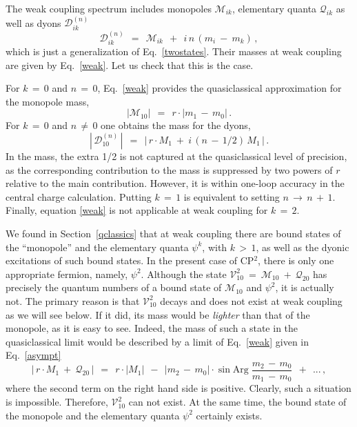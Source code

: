 \documentclass[epsfig,12pt]{article}
\def\beq{\begin{equation}}
\def\eeq{\end{equation}}
\def\beq{\begin{equation}}
\def\eeq{\end{equation}}
\newcommand{\M}{\mathcal{M}}
\newcommand{\Q}{\mathcal{Q}}
\newcommand{\D}{\mathcal{D}}
\newcommand{\V}{\mathcal{V}}
\begin{document}
	The weak coupling spectrum includes monopoles $ \M_{ik} $, elementary quanta $ \Q_{ik} $ 
	as well as dyons $ \D^{(n)}_{ik} $
\beq
	\D^{(n)}_{ik} ~~=~~ \M_{ik} ~~+~~ i\, n\, ( m_i ~-~ m_k ) \,,
\eeq
	which is just a generalization of Eq.~\eqref{twostates}.
	Their masses at weak coupling are given by Eq.~\eqref{weak}.
	Let us check that  this is the case.
	
	For $ k \,=\, 0 $ and $ n \,=\, 0 $, Eq.~\eqref{weak} provides the quasiclassical approximation for the monopole mass,
\beq
	| \M_{10} |  ~~=~~  r \cdot | m_1 \,-\, m_0 | \,.
\eeq
	For $ k \,=\, 0 $ and $ n \,\neq\, 0 $ one obtains the mass for the dyons,
\beq
	\left|\, \D_{10}^{(n)} \,\right|  ~~=~~  \left|\, r \cdot M_1  ~+~  i\, (n \,-\, 1/2)\, M_1 \,\right| \,.
\eeq
	In the mass, the extra 1/2 is not captured at the quasiclassical level of precision, as the corresponding
	contribution to the mass
	is suppressed by two powers of $ r $ relative to the main contribution. However, it is within one-loop accuracy in
	the central charge calculation.
	Putting $ k \,=\, 1 $ is equivalent to setting $ n \,\to\, n \,+\, 1 $.
	Finally, equation \eqref{weak} is not applicable at weak coupling for $ k \,=\, 2 $.

	We found in Section~\ref{qclassics} that at weak coupling there are
	bound states of the ``monopole'' and the elementary quanta $ \psi^k $, with $ k \,>\, 1 $,
	as well as the dyonic excitations of such bound states.
	In the present case of CP$^2$, there is only one appropriate fermion, namely, $ \psi^2 $. 
	Although the state $ \V_{10}^2 ~=~ \M_{10} ~+~ \Q_{20} $ has precisely the quantum numbers
	of a bound state of $ \M_{10} $ and $ \psi^2 $, it is actually not.
	The primary reason is that $ \V_{10}^2 $ decays and does not exist at weak coupling as we will see below.
	If it did, its mass would be \emph{lighter} than that of the monopole, as it is easy to see.
	Indeed, the mass of such a state in the quasiclassical limit would be described by a limit of Eq.~\eqref{weak}
	given in Eq.~\eqref{asympt}
\beq
       |\, r \cdot M_1  ~+~ \Q_{20} \,|  ~~=~~ r \cdot | M_1 |  ~~-~~ | m_2 \,-\, m_0 | \cdot \sin \text{Arg}\; \frac { m_2 \,-\, m_0 } 
                                                                                                                      { m_1 \,-\, m_0 }  
                                                                ~~+~~ ... \,,
\eeq
	where the second term on the right hand side is positive. Clearly, such a situation is impossible.
	Therefore, $ \V_{10}^2 $ can not exist. At the same time, the bound state of the
	monopole and the elementary quanta $ \psi^2$ certainly exists.
\end{document}

